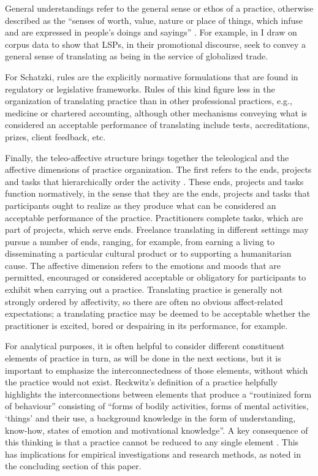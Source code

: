 \documentclass[output=paper,colorlinks,citecolor=brown]{langsci/langscibook}
\begin{document}
General understandings refer to the general sense or ethos of a practice, otherwise described as the \enquote{senses of worth, value, nature or place of things, which infuse and are expressed in people’s doings and sayings} \citep[16]{schatzki_primer_2012}. For example, in \citet[76--77]{olohan_translation_2021} I draw on corpus data to show that LSPs, in their promotional discourse, seek to convey a general sense of translating as being in the service of globalized trade. 

For Schatzki, rules are the explicitly normative formulations that are found in regulatory or legislative frameworks. Rules of this kind figure less in the organization of translating practice than in other professional practices, e.g., medicine or chartered accounting, although other mechanisms conveying what is considered an acceptable performance of translating include tests, accreditations, prizes, client feedback, etc. 

Finally, the teleo-affective structure brings together the teleological and the affective dimensions of practice organization. The first refers to the ends, projects and tasks that hierarchically order the activity \citep[80]{schatzki_site_2002}. These ends, projects and tasks function normatively, in the sense that they are the ends, projects and tasks that participants ought to realize as they produce what can be considered an acceptable performance of the practice. Practitioners complete tasks, which are part of projects, which serve ends. Freelance translating in different settings may pursue a number of ends, ranging, for example, from earning a living to disseminating a particular cultural product or to supporting a humanitarian cause. The affective dimension refers to the emotions and moods that are permitted, encouraged or considered acceptable or obligatory for participants to exhibit when carrying out a practice. Translating practice is generally not strongly ordered by affectivity, so there are often no obvious affect-related expectations; a translating practice may be deemed to be acceptable whether the practitioner is excited, bored or despairing in its performance, for example. 

For analytical purposes, it is often helpful to consider different constituent elements of practice in turn, as will be done in the next sections, but it is important to emphasize the interconnectedness of those elements, without which the practice would not exist. Reckwitz’s \citeyearpar[249]{reckwitz_toward_2002} definition of a practice helpfully highlights the interconnections between elements that produce a \enquote{routinized form of behaviour} consisting of \enquote{forms of bodily activities, forms of mental activities, \enquote{things} and their use, a background knowledge in the form of understanding, know-how, states of emotion and motivational knowledge}. A key consequence of this thinking is that a practice cannot be reduced to any single element \citep[249]{reckwitz_toward_2002}. This has implications for empirical investigations and research methods, as noted in the concluding section of this paper. 
\end{document}
